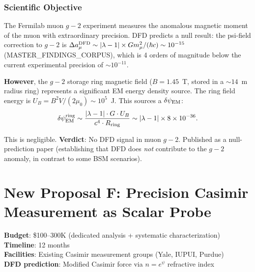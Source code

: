 \documentclass[11pt]{article}
\newcommand{\ee}[1]{\times 10^{#1}}
\newcommand{\dpsi}{\delta\psi}
\begin{document}
\section{Scientific Objective}

The Fermilab muon $g{-}2$ experiment measures the anomalous magnetic
moment of the muon with extraordinary precision. DFD predicts a null
result: the psi-field correction to $g{-}2$ is
$\Delta a_\mu^{\rm DFD} \sim |\lambda-1| \times G m_\mu^2/(\hbar c)
\sim 10^{-15}$ (MASTER\_FINDINGS\_CORPUS), which is 4 orders of magnitude
below the current experimental precision of $\sim 10^{-11}$.

\textbf{However}, the $g{-}2$ storage ring magnetic field ($B = 1.45$~T,
stored in a $\sim 14$~m radius ring) represents a significant EM energy
density source. The ring field energy is
$U_B = B^2 V/(2\mu_0) \sim 10^5$~J. This sources a $\dpsi_{\rm EM}$:
\begin{equation}
\dpsi_{\rm EM}^{\rm ring} \sim \frac{|\lambda-1| \cdot G \cdot U_B}
{c^4 \cdot R_{\rm ring}} \sim |\lambda-1| \times 8\ee{-36}.
\end{equation}

This is negligible. \textbf{Verdict}: No DFD signal in muon $g{-}2$.
Published as a null-prediction paper (establishing that DFD does
\emph{not} contribute to the $g{-}2$ anomaly, in contrast to some
BSM scenarios).


\part{New Proposal F: Precision Casimir Measurement as Scalar Probe}
\label{part:casimir}

\begin{tcolorbox}[colback=purple!3!white, colframe=newcolor,
  title=\textbf{NEW PROPOSAL F --- PRECISION CASIMIR SCALAR PROBE}]
\textbf{Budget}: \$100--300K (dedicated analysis + systematic characterization)\\
\textbf{Timeline}: 12 months\\
\textbf{Facilities}: Existing Casimir measurement groups (Yale, IUPUI, Purdue)\\
\textbf{DFD prediction}: Modified Casimir force via
$n = e^\psi$ refractive index
\end{tcolorbox}
\end{document}
